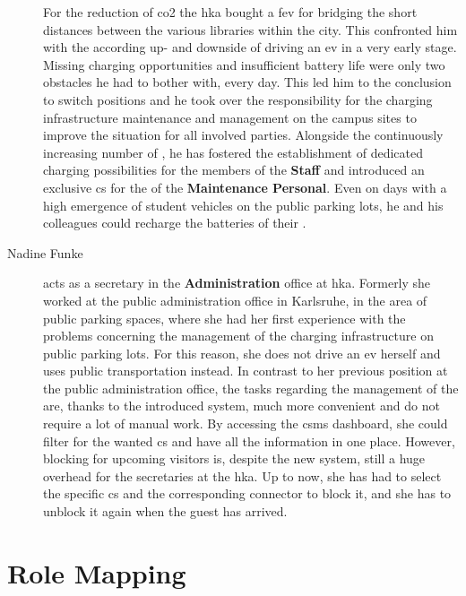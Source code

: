 \begin{description}
    For the reduction of \acrshort{co2} the \acrshort{hka} bought a \acrshort{fev} for bridging the short distances between the various libraries within the city. 
    This confronted him with the according up- and downside of driving an \acrshort{ev} in a very early stage. 
    Missing charging opportunities and insufficient battery life were only two obstacles he had to bother with, every day. 
    This led him to the conclusion to switch positions and he took over the responsibility for the charging infrastructure maintenance and management on the campus sites to improve the situation for all involved parties. 
    Alongside the continuously increasing number of , he has fostered the establishment of dedicated charging possibilities for the members of the \textbf{Staff} and introduced an exclusive \acrshort{cs} for the  of the \textbf{Maintenance Personal}. 
    Even on days with a high emergence of student vehicles on the public parking lots, he and his colleagues could recharge the batteries of their . 
    \newpage
    \item[Nadine Funke] acts as a secretary in the \textbf{Administration} office at \acrshort{hka}. Formerly she worked at the public administration office in Karlsruhe, in the area of public parking spaces, where she had her first experience with the problems concerning the management of the charging infrastructure on public parking lots. 
    For this reason, she does not drive an \acrshort{ev} herself and uses public transportation instead. In contrast to her previous position at the public administration office, the tasks regarding the management of the  are, thanks to the introduced system, much more convenient and do not require a lot of manual work. 
    By accessing the \acrshort{csms} dashboard, she could filter for the wanted \acrshort{cs} and have all the information in one place. 
    However, blocking  for upcoming visitors is, despite the new system, still a huge overhead for the secretaries at the \acrshort{hka}. 
    Up to now, she has had to select the specific \acrshort{cs} and the corresponding connector to block it, and she has to unblock it again when the guest has arrived.
\end{description}

\section{Role Mapping}
\label{ch:Requirements Engineering:sec:Role Mapping}

